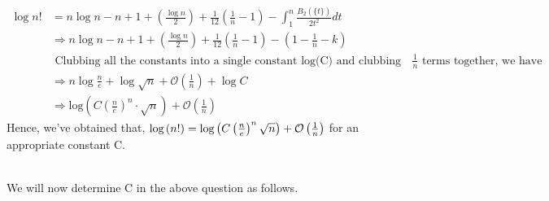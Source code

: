 \documentclass[letterpaper]{exam}
\begin{document}
\begin{questions}
\begin{solution}
\begin{align*}
    \log{n!} &=  n\log{n} - n + 1 + \left(\frac{\log{n}}{2}\right) + \frac{1}{12}\left(\frac{1}{n} - 1\right) - \int_{1}^{n} \frac{B_{2}(\{t\})}{2t^2} dt\\
    &\Rightarrow
    n\log{n} - n + 1 + \left(\frac{\log{n}}{2}\right) + \frac{1}{12}\left(\frac{1}{n} - 1\right) - \left(1 - \frac{1}{n} - k\right)\\
    &
    \mbox{ Clubbing all the constants into a single constant log(C) and clubbing all the $\frac{1}{n}$ terms together, we have}\\
    &\Rightarrow
    n\log{\frac{n}{e}} + \log{\sqrt{n}} + \mathcal{O}\left(\frac{1}{n}\right) + \log{C} \\
    &\Rightarrow
    \text{log}\left(C\left(\frac{n}{e}\right)^n\cdot\sqrt{n}\right) + \mathcal{O}\left(\frac{1}{n}\right)
\end{align*}
Hence, we've obtained that, $\text{log}\left(n!\right) = \text{log}\left(\huge{C}\left(\frac{n}{e}\right)^{n}\sqrt{n} \right) + \mathcal{O}\left(\frac{1}{n}\right)$ for an appropriate constant C.
\end{solution}
\\
We will now determine C in the above question as follows.
\begin{parts}

\end{parts}
\end{questions}
\end{document}

